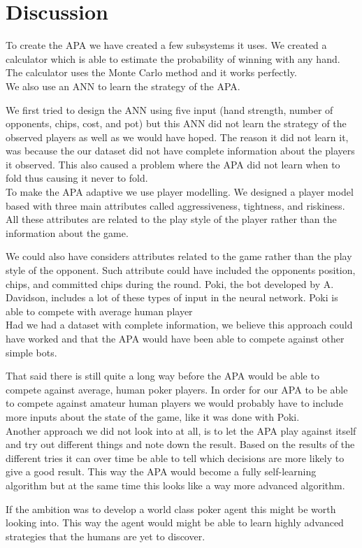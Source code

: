\section{Discussion}
To create the APA we have created a few subsystems it uses. We created a calculator which is able to estimate the probability of winning with any hand. The calculator uses the Monte Carlo method and it works perfectly.\\

We also use an ANN to learn the strategy of the APA. 

We first tried to design the ANN using five input (hand strength, number of opponents, chips, cost, and pot) but this ANN did not learn the strategy of the observed players as well as we would have hoped. The reason it did not learn it, was because the our dataset did not have complete information about the players it observed. This also caused a problem where the APA did not learn when to fold thus causing it never to fold.\\

To make the APA adaptive we use player modelling. We designed a player model based with three main attributes called aggressiveness, tightness, and riskiness. All these attributes are related to the play style of the player rather than the information about the game.  

We could also have considers attributes related to the game rather than the play style of the opponent. Such attribute could have included the opponents position, chips, and committed chips during the round. Poki, the bot developed by A. Davidson, includes a lot of these types of input in the neural network. Poki is able to compete with average human player\\

Had we had a dataset with complete information, we believe this approach could have worked and that the APA would have been able to compete against other simple bots.

That said there is still quite a long way before the APA would be able to compete against average, human poker players. In order for our APA to be able to compete against amateur human players we would probably have to include more inputs about the state of the game, like it was done with Poki.\\

Another approach we did not look into at all, is to let the APA play against itself and try out different things and note down the result. Based on the results of the different tries it can over time be able to tell which decisions are more likely to give a good result. This way the APA would become a fully self-learning algorithm but at the same time this looks like a way more advanced algorithm. 

If the ambition was to develop a world class poker agent this might be worth looking into. This way the agent would might be able to learn highly advanced strategies that the humans are yet to discover.